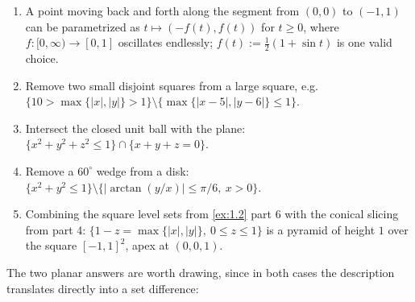 \begin{exercisesolution}
\begin{enumerate}[label=\textbf{\arabic*.}]
  \item A point moving back and forth along the segment from $(0,0)$ to $(-1,1)$ can be
    parametrized as $t \mapsto (-f(t), f(t))$ for $t \geq 0$, where $f : [0,\infty) \to [0,1]$
    oscillates endlessly; $f(t) := \tfrac{1}{2}(1+\sin t)$ is one valid choice.
  \item Remove two small disjoint squares from a large square, e.g.
    $\{10 > \max\{|x|,|y|\} > 1\} \setminus \{\max\{|x-5|,|y-6|\} \leq 1\}$.
  \item Intersect the closed unit ball with the plane: $\{x^2+y^2+z^2 \leq 1\} \cap \{x+y+z=0\}$.
  \item Remove a $60^\circ$ wedge from a disk:
    $\{x^2+y^2 \leq 1\} \setminus \{|\arctan(y/x)| \leq \pi/6,\ x>0\}$.
  \item Combining the square level sets from \cref{ex:1.2} part 6 with the conical slicing from
    part 4: $\{1-z = \max\{|x|,|y|\},\ 0 \leq z \leq 1\}$ is a pyramid of height $1$ over the
    square $[-1,1]^2$, apex at $(0,0,1)$.
\end{enumerate}

The two planar answers are worth drawing, since in both cases the description 
translates directly into a set difference:

\begin{center}
\end{center}
\end{exercisesolution}
